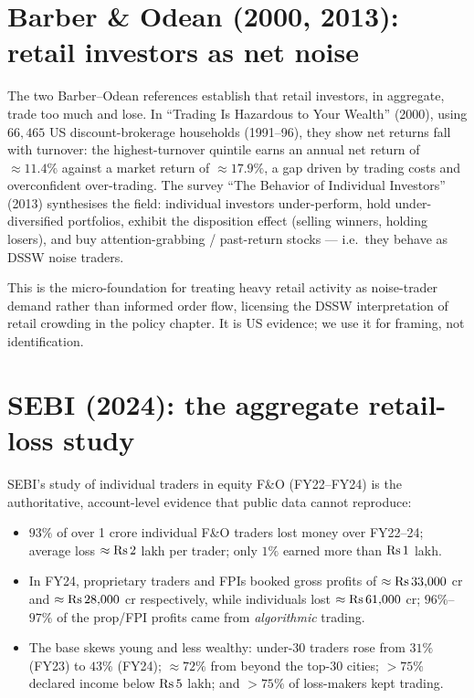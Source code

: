 \section{Barber \& Odean (2000, 2013): retail investors as net noise}
\label{sec:barber-odean}
The two Barber--Odean references establish that retail investors, in aggregate, trade too much and lose. In ``Trading Is Hazardous to Your Wealth'' (2000), using $66{,}465$ US discount-brokerage households (1991--96), they show net returns fall with turnover: the highest-turnover quintile earns an annual net return of $\approx 11.4\%$ against a market return of $\approx 17.9\%$, a gap driven by trading costs and overconfident over-trading. The survey ``The Behavior of Individual Investors'' (2013) synthesises the field: individual investors under-perform, hold under-diversified portfolios, exhibit the disposition effect (selling winners, holding losers), and buy attention-grabbing / past-return stocks --- i.e.\ they behave as DSSW noise traders.

\begin{takeaway}
This is the micro-foundation for treating heavy retail activity as noise-trader demand rather than informed order flow, licensing the DSSW interpretation of retail crowding in the policy chapter. It is US evidence; we use it for framing, not identification.
\end{takeaway}

\section{SEBI (2024): the aggregate retail-loss study}
\label{sec:sebi-loss}
SEBI's study of individual traders in equity F\&O (FY22--FY24) is the authoritative, account-level evidence that public data cannot reproduce:
\begin{itemize}[leftmargin=1.4em,itemsep=1pt]
\item $93\%$ of over 1 crore individual F\&O traders lost money over FY22--24; average loss $\approx \mathrm{Rs}\, 2$ lakh per trader; only $1\%$ earned more than $\mathrm{Rs}\, 1$ lakh.
\item In FY24, proprietary traders and FPIs booked gross profits of $\approx \mathrm{Rs}\, 33{,}000$ cr and $\approx \mathrm{Rs}\, 28{,}000$ cr respectively, while individuals lost $\approx \mathrm{Rs}\, 61{,}000$ cr; $96\%$--$97\%$ of the prop/FPI profits came from \emph{algorithmic} trading.
\item The base skews young and less wealthy: under-30 traders rose from $31\%$ (FY23) to $43\%$ (FY24); $\approx 72\%$ from beyond the top-30 cities; $>75\%$ declared income below $\mathrm{Rs}\, 5$ lakh; and $>75\%$ of loss-makers kept trading.
\end{itemize}

